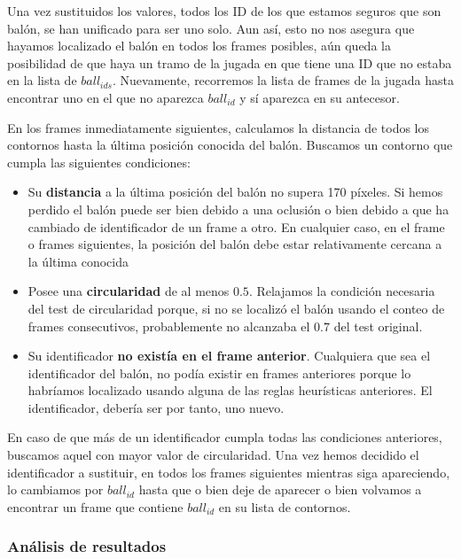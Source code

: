 Una vez sustituidos los valores, todos los ID de los que estamos seguros que son balón, se han unificado para ser uno solo. Aun así, esto no nos asegura que hayamos localizado el balón en todos los frames posibles, aún queda la posibilidad de que haya un tramo de la jugada en que tiene una ID que no estaba en la lista de $ball_{ids}$. Nuevamente, recorremos la lista de frames de la jugada hasta encontrar uno en el que no aparezca $ball_{id}$ y sí aparezca en su antecesor. 

En los frames inmediatamente siguientes, calculamos la distancia de todos los contornos hasta la última posición conocida del balón. Buscamos un contorno que cumpla las siguientes condiciones:
\begin{itemize}
  \item Su \textbf{distancia} a la última posición del balón no supera 170 píxeles. Si hemos perdido el balón puede ser bien debido a una oclusión o bien debido a que ha cambiado de identificador de un frame a otro. En cualquier caso, en el frame o frames siguientes, la posición del balón debe estar relativamente cercana a la última conocida
  \item Posee una \textbf{circularidad} de al menos $0.5$. Relajamos la condición necesaria del test de circularidad porque, si no se localizó el balón usando el conteo de frames consecutivos, probablemente no alcanzaba el $0.7$ del test original.
  \item  Su identificador \textbf{no existía en el frame anterior}. Cualquiera que sea el identificador del balón, no podía existir en frames anteriores porque lo habríamos localizado usando alguna de las reglas heurísticas anteriores. El identificador, debería ser por tanto, uno nuevo.
\end{itemize}

En caso de que más de un identificador cumpla todas las condiciones anteriores, buscamos aquel con mayor valor de circularidad. Una vez hemos decidido el identificador a sustituir, en todos los frames siguientes mientras siga apareciendo, lo cambiamos por $ball_{id}$ hasta que o bien deje de aparecer o bien volvamos a encontrar un frame que contiene $ball_{id}$ en su lista de contornos. 

\subsubsection*{Análisis de resultados}

